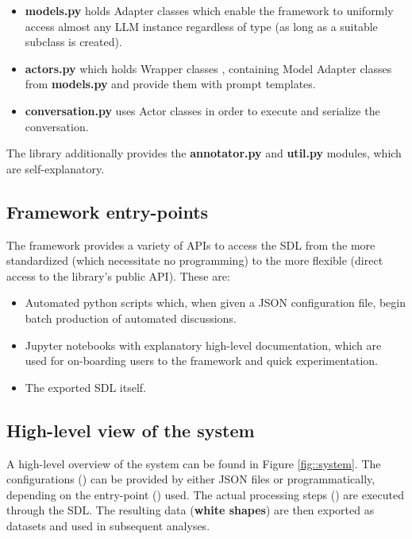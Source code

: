 \begin{itemize}
	\item \textbf{models.py} holds Adapter classes \cite{gamma1995design} which enable the framework to uniformly access almost any LLM instance regardless of type (as long as a suitable subclass is created).
	
	\item \textbf{actors.py} which holds Wrapper classes \cite{gamma1995design}, containing Model Adapter classes from \textbf{models.py} and provide them with prompt templates.
	
	\item \textbf{conversation.py} uses Actor classes in order to execute and serialize the conversation.
\end{itemize}

The library additionally provides the \textbf{annotator.py} and \textbf{util.py} modules, which are self-explanatory.


\subsection{Framework entry-points}
\label{ssec:system:entrypoints}

The framework provides a variety of \acp{API} to access the \ac{SDL} from the more standardized (which necessitate no programming) to the more flexible (direct access to the library's public \ac{API}). These are:

\begin{itemize}
	\item Automated python scripts which, when given a \ac{JSON} configuration file, begin batch production of automated discussions.
	
	\item Jupyter notebooks with explanatory high-level documentation, which are used for on-boarding users to the framework and quick experimentation.
	
	\item The exported \ac{SDL} itself.
\end{itemize}


\subsection{High-level view of the system}
\label{ssec:system:overview}

A high-level overview of the system can be found in Figure \ref{fig::system}. The configurations () can be provided by either \ac{JSON} files or programmatically, depending on the entry-point () used. The actual processing steps () are executed through the \ac{SDL}. The resulting data (\textbf{white shapes}) are then exported as datasets and used in subsequent analyses.

